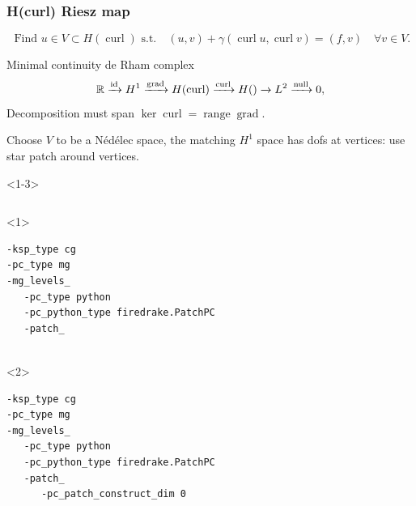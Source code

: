 \documentclass[presentation,aspectratio=43,10pt]{beamer}
\DeclareMathOperator{\grad}{grad}
\let\div\relax
\DeclareMathOperator{\div}{div}
\DeclareMathOperator{\curl}{curl}
\DeclareMathOperator{\range}{range}
\begin{document}
\begin{frame}[fragile]
  \frametitle{H(curl) Riesz map}
  \vspace{-1.5\baselineskip}
  \begin{equation*}
    \text{  Find $u \in V \subset H(\curl)$ s.t.} \quad (u, v) + \gamma (\curl u, \curl v) = (f, v) \quad \forall v \in V.
  \end{equation*}
  \vspace{-\baselineskip}
  \begin{block}{Minimal continuity de Rham complex}
    \begin{equation*}
      \mathbb{R} \xrightarrow{\operatorname{id}} H^1 \xrightarrow{\grad} H(\curl)
      \xrightarrow{\curl} H(\div) \xrightarrow{\div} L^2 \xrightarrow{\operatorname{null}} 0,
    \end{equation*}
    Decomposition must span $\ker \curl = \range \grad$.

    Choose $V$ to be a N\'ed\'elec space, the matching $H^1$
    space has dofs at vertices: use star patch around vertices.
  \end{block}
  \begin{onlyenv}<1-3>
    \begin{columns}
      \begin{column}{0.6\textwidth}
        \begin{onlyenv}<1>
\begin{verbatim}
-ksp_type cg
-pc_type mg
-mg_levels_
   -pc_type python
   -pc_python_type firedrake.PatchPC
   -patch_


\end{verbatim}
        \end{onlyenv}
        \begin{onlyenv}<2>
\begin{verbatim}
-ksp_type cg
-pc_type mg
-mg_levels_
   -pc_type python
   -pc_python_type firedrake.PatchPC
   -patch_
      -pc_patch_construct_dim 0


\end{verbatim}
\end{onlyenv}
\end{column}
\end{columns}
\end{onlyenv}
\end{frame}
\end{document}
